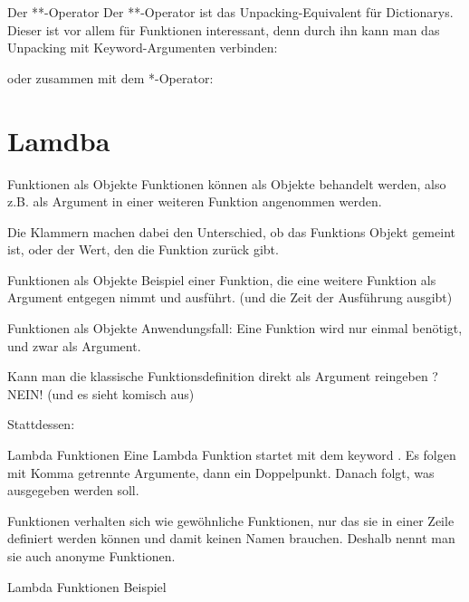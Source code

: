 \begin{frame}{Der **-Operator}
	Der **-Operator ist das Unpacking-Equivalent für Dictionarys. Dieser ist vor allem für Funktionen interessant, denn durch ihn kann man das Unpacking mit Keyword-Argumenten verbinden:
	
	oder zusammen mit dem *-Operator:
	
\end{frame}



\section{Lamdba}

\begin{frame}{Funktionen als Objekte}
	Funktionen können als Objekte behandelt werden, also z.B. als Argument in einer weiteren Funktion angenommen werden.
	
	
	Die Klammern machen dabei den Unterschied, ob das Funktions Objekt gemeint ist, oder der Wert, den die Funktion zurück gibt.
\end{frame}

\begin{frame}{Funktionen als Objekte}
	Beispiel einer Funktion, die eine weitere Funktion  als Argument entgegen nimmt und ausführt. (und die Zeit der Ausführung ausgibt) 
	
\end{frame}

\begin{frame}{Funktionen als Objekte}
	Anwendungsfall: Eine Funktion wird nur einmal benötigt, und zwar als Argument.
	
	Kann man die klassische Funktionsdefinition direkt als Argument reingeben ? \alert{NEIN! (und es sieht komisch aus)}
	
	Stattdessen:
		
\end{frame}

\begin{frame}{Lambda Funktionen}
	Eine Lambda Funktion startet mit dem keyword . Es folgen mit Komma getrennte Argumente, dann ein Doppelpunkt. Danach folgt, was ausgegeben werden soll.
	
	 Funktionen verhalten sich wie gewöhnliche Funktionen, nur das sie in einer Zeile definiert werden können und damit keinen Namen brauchen. Deshalb nennt man sie auch \alert{anonyme Funktionen}.
\end{frame}

\begin{frame}{Lambda Funktionen}
	Beispiel 
	
\end{frame}


